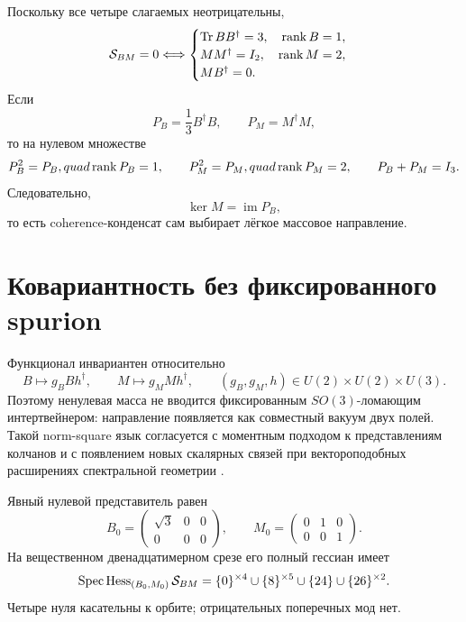 Поскольку все четыре слагаемых неотрицательны,
\begin{equation}
 \mathcal S_{BM}=0
 \Longleftrightarrow
 \begin{cases}
 \operatorname{Tr} BB^\dagger=3,\quad \operatorname{rank} B=1,\\
 MM^\dagger=I_2,\quad \operatorname{rank} M=2,\\
 MB^\dagger=0.
 \end{cases}
 \label{eq:v8-isotypic-mass-selector-zero-set}
\end{equation}
Если
\begin{equation}
 P_B=\frac13B^\dagger B,
 \qquad
 P_M=M^\dagger M,
 \label{eq:v8-isotypic-mass-selector-projectors}
\end{equation}
то на нулевом множестве
\begin{equation}
 P_B^2=P_B,quad \operatorname{rank} P_B=1,
 \qquad
 P_M^2=P_M,quad \operatorname{rank} P_M=2,
 \qquad
 P_B+P_M=I_3.
 \label{eq:v8-isotypic-mass-selector-complementarity}
\end{equation}
Следовательно,
\begin{equation}
 \ker M=\operatorname{im}P_B,
 \label{eq:v8-isotypic-mass-selector-kernel-alignment}
\end{equation}
то есть coherence-конденсат сам выбирает лёгкое массовое направление.

\section{Ковариантность без фиксированного spurion}

Функционал инвариантен относительно
\begin{equation}
 B\mapsto g_BBh^\dagger,
 \qquad
 M\mapsto g_MMh^\dagger,
 \qquad
 (g_B,g_M,h)\in U(2)\times U(2)\times U(3).
 \label{eq:v8-isotypic-mass-selector-covariance}
\end{equation}
Поэтому ненулевая масса не вводится фиксированным $SO(3)$-ломающим
интертвейнером: направление появляется как совместный вакуум двух полей.
Такой norm-square язык согласуется с моментным подходом к представлениям
колчанов \cite{v8-isotypic-mass-selector-quiver} и с появлением новых
скалярных связей при вектороподобных расширениях спектральной геометрии
\cite{v8-isotypic-mass-selector-scalar}.

Явный нулевой представитель равен
\begin{equation}
 B_0=\begin{pmatrix}\sqrt3&0&0\\0&0&0\end{pmatrix},
 \qquad
 M_0=\begin{pmatrix}0&1&0\\0&0&1\end{pmatrix}.
 \label{eq:v8-isotypic-mass-selector-vacuum}
\end{equation}
На вещественном двенадцатимерном срезе его полный гессиан имеет
\begin{equation}
 \operatorname{Spec}\operatorname{Hess}_{(B_0,M_0)}\mathcal S_{BM}
 =\{0\}^{\times4}\cup\{8\}^{\times5}
 \cup\{24\}\cup\{26\}^{\times2}.
 \label{eq:v8-isotypic-mass-selector-hessian}
\end{equation}
Четыре нуля касательны к орбите; отрицательных поперечных мод нет.

